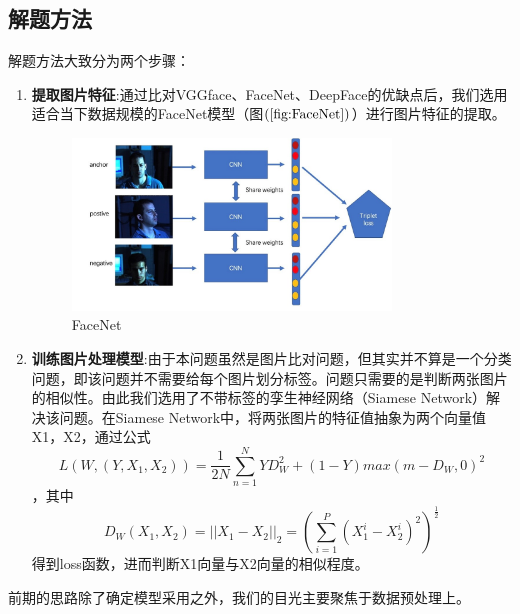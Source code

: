 \documentclass[UTF8]{ctexart}
\begin{document}
\subsection{解题方法}
解题方法大致分为两个步骤：
\begin{enumerate}
  \item \textbf{提取图片特征}:通过比对VGGface、FaceNet、DeepFace的优缺点后，我们选用适合当下数据规模的FaceNet模型（图$\left(\ref{fig:FaceNet}\right)$）进行图片特征的提取。
  
  \begin{figure}[!ht]
    \centering
    \includegraphics[width=0.8\textwidth]{FaceNet.jpg}
    \caption{FaceNet}
    \label{fig:FaceNet}
  \end{figure}

  \item \textbf{训练图片处理模型}:由于本问题虽然是图片比对问题，但其实并不算是一个分类问题，即该问题并不需要给每个图片划分标签。问题只需要的是判断两张图片的相似性。由此我们选用了不带标签的孪生神经网络（Siamese Network）解决该问题。在Siamese Network中，将两张图片的特征值抽象为两个向量值X1，X2，通过公式\[L(W,(Y,X_1,X_2))=\frac{1}{2N}\sum_{n=1}^{N}YD^2_W+(1-Y)max(m-D_W,0)^2\]，其中\[D_W(X_1,X_2)=||X_1-X_2||_2=(\sum_{i=1}^{P}(X^i_1-X^i_2)^2)^\frac{1}{2}\]得到loss函数，进而判断X1向量与X2向量的相似程度。
\end{enumerate}

前期的思路除了确定模型采用之外，我们的目光主要聚焦于数据预处理上。
\end{document}
